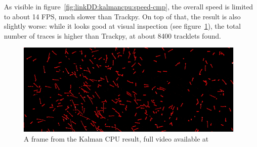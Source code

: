 As visible in figure~\ref{fig:linkDD:kalmancpu:speed-cmp}, the overall speed is limited to about 14 FPS, much slower than Trackpy.
On top of that, the result is also slightly worse: while it looks good at visual inspection (see figure~\ref{fig:linkDD:kalmancpu}), the total number of traces is higher than Trackpy, at about 8400 tracklets found.

\begin{figure}[H]
	\centerline{\includegraphics[width=\locateimgsize]{images/link2d/kalman_CPU.png}}
	\caption{\centering A frame from the Kalman CPU \linkDD* result, full video available at~\cite{linkDD-kalman-cpu}}
	\label{fig:linkDD:kalmancpu}
\end{figure}
